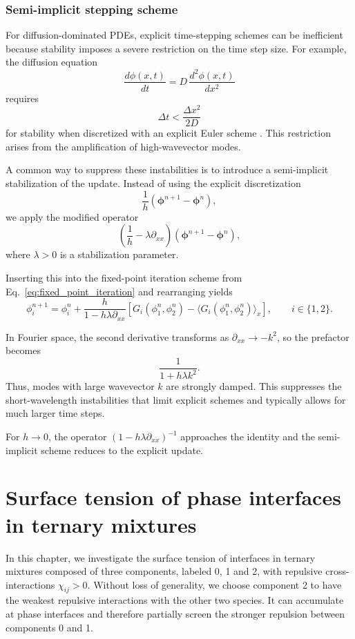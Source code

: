 \documentclass[12pt]{article}
\begin{document}
\subsubsection{Semi-implicit stepping scheme}

For diffusion-dominated PDEs, explicit time-stepping schemes can be inefficient because stability imposes a severe restriction on the time step size. For example, the diffusion equation
\[
\frac{d\phi(x,t)}{ dt} = D\,\frac{d^2\phi(x,t)}{dx^2}
\]
requires
\[
\Delta t < \frac{\Delta x^2}{2D}
\]
for stability when discretized with an explicit Euler scheme \cite{Jeong2018StabilityOF}. This restriction arises from the amplification of high-wavevector modes.

A common way to suppress these instabilities is to introduce a semi-implicit stabilization of the update. Instead of using the explicit discretization
\[
\frac{1}{h}\left(\boldsymbol{\phi}^{n+1}-\boldsymbol{\phi}^{n}\right),
\]
we apply the modified operator
\[
\left(\frac{1}{h}-\lambda \partial_{xx}\right)
\left(\boldsymbol{\phi}^{n+1}-\boldsymbol{\phi}^{n}\right),
\]
where \(\lambda>0\) is a stabilization parameter. 

Inserting this into the fixed-point iteration scheme from Eq.~\eqref{eq:fixed_point_iteration} and rearranging yields
\begin{equation}
    \phi_i^{n+1}
=
\phi_i^n
+
\frac{h}{1-h\lambda \partial_{xx}}
\left[
G_i(\phi_1^n,\phi_2^n)
-
\langle G_i(\phi_1^n,\phi_2^n)\rangle_x
\right],
\qquad i\in\{1,2\}.
\end{equation}

In Fourier space, the second derivative transforms as \(\partial_{xx} \to -k^2\), so the prefactor becomes
\[
\frac{1}{1+h\lambda k^2}.
\]
Thus, modes with large wavevector \(k\) are strongly damped. This suppresses the short-wavelength instabilities that limit explicit schemes and typically allows for much larger time steps.

For \(h\to 0\), the operator \((1-h\lambda\partial_{xx})^{-1}\) approaches the identity and the semi-implicit scheme reduces to the explicit update.

\clearpage
\section{Surface tension of phase interfaces in ternary mixtures}\label{s:surface_tension}
In this chapter, we investigate the surface tension of interfaces in ternary mixtures composed of three components, labeled 0, 1 and 2, with repulsive cross-interactions \(\chi_{ij}>0\).
Without loss of generality, we choose component 2 to have the weakest repulsive interactions with the other two species.
It can accumulate at phase interfaces and therefore partially screen the stronger repulsion between components 0 and 1.
\end{document}
